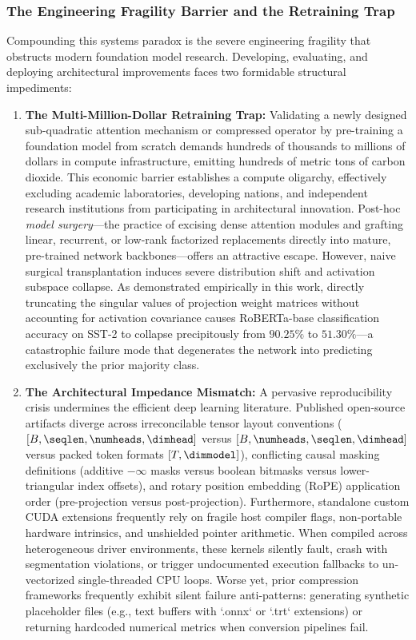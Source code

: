 \subsubsection{The Engineering Fragility Barrier and the Retraining Trap}
\label{subsubsec:fragility_barrier}

Compounding this systems paradox is the severe engineering fragility that obstructs modern foundation model research.
Developing, evaluating, and deploying architectural improvements faces two formidable structural impediments:
\begin{enumerate}
    \item \textbf{The Multi-Million-Dollar Retraining Trap:} 
    Validating a newly designed sub-quadratic attention mechanism or compressed operator by pre-training a foundation model from scratch demands hundreds of thousands to millions of dollars in compute infrastructure, emitting hundreds of metric tons of carbon dioxide.
    This economic barrier establishes a compute oligarchy, effectively excluding academic laboratories, developing nations, and independent research institutions from participating in architectural innovation.
    Post-hoc \emph{model surgery}—the practice of excising dense attention modules and grafting linear, recurrent, or low-rank factorized replacements directly into mature, pre-trained network backbones—offers an attractive escape.
    However, naive surgical transplantation induces severe distribution shift and activation subspace collapse.
    As demonstrated empirically in this work, directly truncating the singular values of projection weight matrices without accounting for activation covariance causes RoBERTa-base classification accuracy on SST-2 to collapse precipitously from $90.25\%$ to $51.30\%$—a catastrophic failure mode that degenerates the network into predicting exclusively the prior majority class.

    \item \textbf{The Architectural Impedance Mismatch:} 
    A pervasive reproducibility crisis undermines the efficient deep learning literature.
    Published open-source artifacts diverge across irreconcilable tensor layout conventions ($[B, \seqlen, \numheads, \dimhead]$ versus $[B, \numheads, \seqlen, \dimhead]$ versus packed token formats $[T, \dimmodel]$), conflicting causal masking definitions (additive $-\infty$ masks versus boolean bitmasks versus lower-triangular index offsets), and rotary position embedding (RoPE) application order (pre-projection versus post-projection).
    Furthermore, standalone custom CUDA extensions frequently rely on fragile host compiler flags, non-portable hardware intrinsics, and unshielded pointer arithmetic.
    When compiled across heterogeneous driver environments, these kernels silently fault, crash with segmentation violations, or trigger undocumented execution fallbacks to un-vectorized single-threaded CPU loops.
    Worse yet, prior compression frameworks frequently exhibit silent failure anti-patterns: generating synthetic placeholder files (e.g., text buffers with `.onnx` or `.trt` extensions) or returning hardcoded numerical metrics when conversion pipelines fail.
\end{enumerate}


